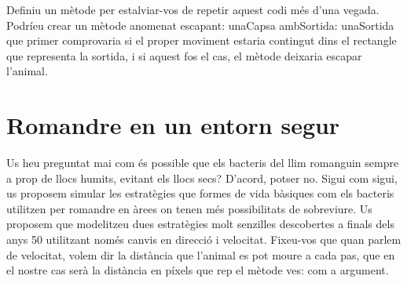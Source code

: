 Definiu un mètode per estalviar-vos de repetir aquest codi més d'una vegada. Podríeu crear un mètode anomenat \textsf{escapant: unaCapsa ambSortida: unaSortida} que primer comprovaria si el proper moviment estaria contingut dins el rectangle que representa la sortida, i si aquest fos el cas, el mètode deixaria escapar l'animal. 

\section{Romandre en un entorn segur}
Us heu preguntat mai com és possible que els bacteris del llim romanguin sempre a prop de llocs humits, evitant els llocs secs? D'acord, potser no. Sigui com sigui, us proposem simular les estratègies que formes de vida bàsiques com els bacteris utilitzen per romandre en àrees on tenen més possibilitats de sobreviure. Us proposem que modelitzeu dues estratègies molt senzilles descobertes a finals dels anys 50 utilitzant només canvis en direcció i velocitat. Fixeu-vos que quan parlem de velocitat, volem dir la distància que l'animal es pot moure a cada pas, que en el nostre cas serà la distància en píxels que rep el mètode \textsf{ves:} com a argument.

